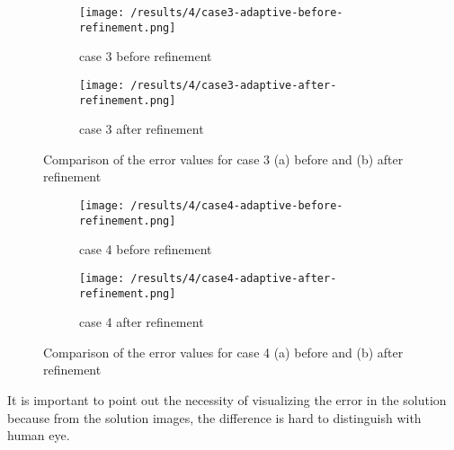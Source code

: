 \begin{figure}[h]
	\centering
    \begin{subfigure}[b]{0.49\textwidth}
	    \texttt{[image: /results/4/case3-adaptive-before-refinement.png]}
		\centering
        \caption{case 3 before refinement}
        \label{fig:AdaptiveCase3Before}
    \end{subfigure} 
    \begin{subfigure}[b]{0.49\textwidth}    
	    \texttt{[image: /results/4/case3-adaptive-after-refinement.png]}
		\centering    
	 \caption{case 3 after refinement}
       \label{fig:AdaptiveCase3After}
    \end{subfigure} 
    \caption{Comparison of the error values for case 3 (a) before and (b) after refinement}
    \label{fig:AdaptiveCase3}
\end{figure}

\begin{figure}[h]
	\centering
    \begin{subfigure}[b]{0.49\textwidth}
	    \texttt{[image: /results/4/case4-adaptive-before-refinement.png]}
		\centering
        \caption{case 4 before refinement}
        \label{fig:AdaptiveCase4Before}
    \end{subfigure} 
    \begin{subfigure}[b]{0.49\textwidth}    
	    \texttt{[image: /results/4/case4-adaptive-after-refinement.png]}
		\centering    
	 \caption{case 4 after refinement}
       \label{fig:AdaptiveCase4After}
    \end{subfigure} 
    \caption{Comparison of the error values for case 4 (a) before and (b) after refinement}
    \label{fig:AdaptiveCase4}
\end{figure}


It is important to point out the necessity of visualizing the error in the solution because from the solution images, the difference is hard to distinguish with human eye.

